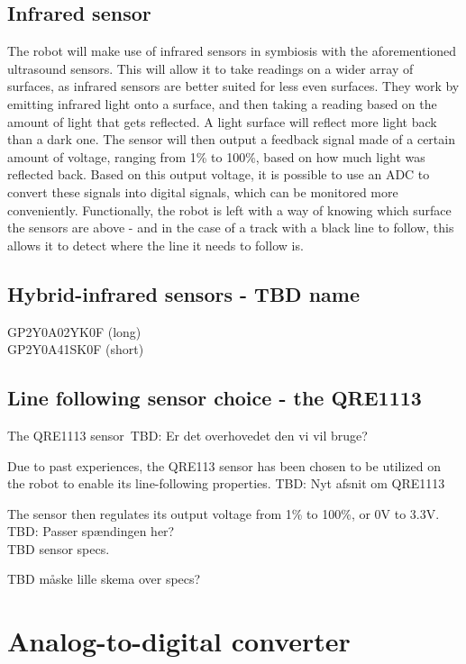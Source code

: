 \subsection{Infrared sensor}

The robot will make use of infrared sensors in symbiosis with the aforementioned ultrasound sensors. This will allow it to take readings on a wider array of surfaces, as infrared sensors are better suited for less even surfaces. They work by emitting infrared light onto a surface, and then taking a reading based on the amount of light that gets reflected. A light surface will reflect more light back than a dark one. The sensor will then output a feedback signal made of a certain amount of voltage, ranging from 1\% to 100\%, based on how much light was reflected back. Based on this output voltage, it is possible to use an ADC to convert these signals into digital signals, which can be monitored more conveniently. Functionally, the robot is left with a way of knowing which surface the sensors are above - and in the case of a track with a black line to follow, this allows it to detect where the line it needs to follow is.\\

\subsection{Hybrid-infrared sensors - TBD name}

GP2Y0A02YK0F (long) \\	
GP2Y0A41SK0F (short) \\

\subsection{Line following sensor choice - the QRE1113} 

The QRE1113 sensor\
TBD: Er det overhovedet den vi vil bruge?\

Due to past experiences, the QRE113 sensor has been chosen to be utilized on the robot to enable its line-following properties. TBD: Nyt afsnit om QRE1113

The sensor then regulates its output voltage from 1\% to 100\%, or 0V to 3.3V. TBD: Passer spændingen her?\\

TBD sensor specs.\

TBD måske lille skema over specs?

\section{Analog-to-digital converter}


